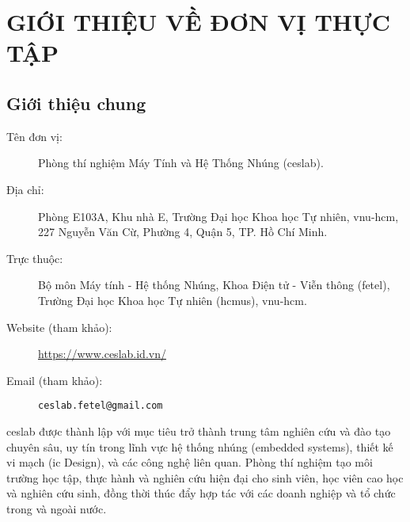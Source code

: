 

\chapter{GIỚI THIỆU VỀ ĐƠN VỊ THỰC TẬP}
\label{Chapter1} %

\section{Giới thiệu chung}
\label{subsec:ceslab_general}

\begin{description}
    \item[Tên đơn vị:] Phòng thí nghiệm Máy Tính và Hệ Thống Nhúng (\acrshort{ceslab}).
    \item[Địa chỉ:] Phòng E103A, Khu nhà E, Trường Đại học Khoa học Tự nhiên, \acrshort{vnu-hcm}, 227 Nguyễn Văn Cừ, Phường 4, Quận 5, TP. Hồ Chí Minh.
    \item[Trực thuộc:] Bộ môn Máy tính - Hệ thống Nhúng, Khoa Điện tử - Viễn thông (\acrshort{fetel}), Trường Đại học Khoa học Tự nhiên (\acrshort{hcmus}), \acrshort{vnu-hcm}.
    \item[Website (tham khảo):] \url{https://www.ceslab.id.vn/}
    \item[Email (tham khảo):] \texttt{ceslab.fetel@gmail.com}
\end{description}

\acrshort{ceslab} được thành lập với mục tiêu trở thành trung tâm nghiên cứu và đào tạo chuyên sâu, uy tín trong lĩnh vực hệ thống nhúng (embedded systems), thiết kế vi mạch (\acrshort{ic} Design), và các công nghệ liên quan. Phòng thí nghiệm tạo môi trường học tập, thực hành và nghiên cứu hiện đại cho sinh viên, học viên cao học và nghiên cứu sinh, đồng thời thúc đẩy hợp tác với các doanh nghiệp và tổ chức trong và ngoài nước.

